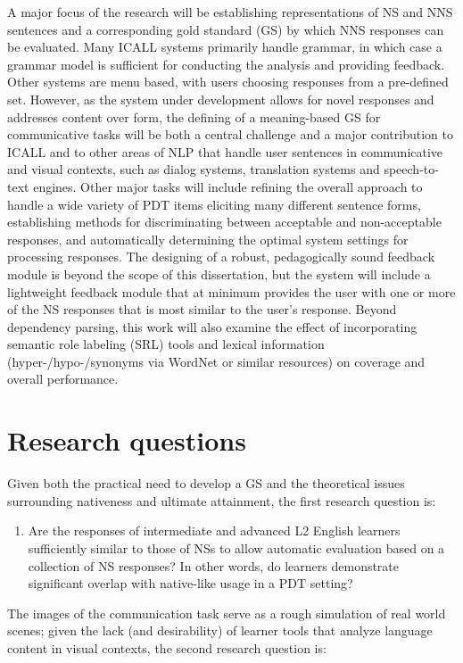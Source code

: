 \par A major focus of the research will be establishing representations of NS and NNS sentences and a corresponding gold standard (GS) by which NNS responses can be evaluated. Many ICALL systems primarily handle grammar, in which case a grammar model is sufficient for conducting the analysis and providing feedback. Other systems are menu based, with users choosing responses from a pre-defined set. However, as the system under development allows for novel responses and addresses content over form, the defining of a meaning-based GS for communicative tasks will be both a central challenge and a major contribution to ICALL and to other areas of NLP that handle user sentences in communicative and visual contexts, such as dialog systems, translation systems and speech-to-text engines. Other major tasks will include refining the overall approach to handle a wide variety of PDT items eliciting many different sentence forms, establishing methods for discriminating between acceptable and non-acceptable responses, and automatically determining the optimal system settings for processing responses. The designing of a robust, pedagogically sound feedback module is beyond the scope of this dissertation, but the system will include a lightweight feedback module that at minimum provides the user with one or more of the NS responses that is most similar to the user's response. Beyond dependency parsing, this work will also examine the effect of incorporating semantic role labeling (SRL) tools and lexical information (hyper-/hypo-/synonyms via WordNet or similar resources) on coverage and overall performance.\\

\section{Research questions}
Given both the practical need to develop a GS and the theoretical issues surrounding nativeness and ultimate attainment, the first research question is:

\begin{enumerate}
\item{Are the responses of intermediate and advanced L2 English learners sufficiently similar to those of NSs to allow automatic evaluation based on a collection of NS responses? In other words, do learners demonstrate significant overlap with native-like usage in a PDT setting?} %
\end{enumerate}
The images of the communication task serve as a rough simulation of real world scenes; given the lack (and desirability) of learner tools that analyze language content in visual contexts, the second research question is:

